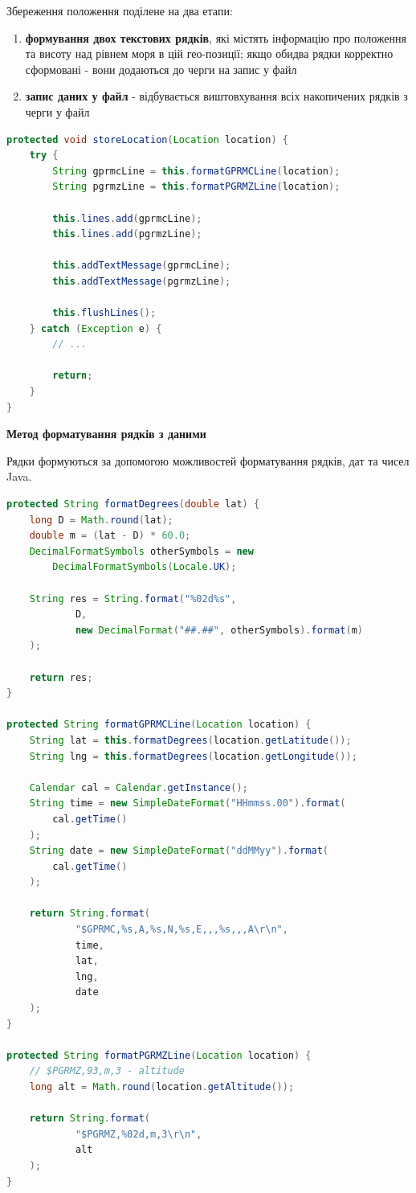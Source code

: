 \documentclass[simple,a4paper,14pt,ukrainian,utf8]{eskdtext}
\begin{document}
			Збереження положення поділене на два етапи:
			
			\begin{enumerate}
				\item \textbf{формування двох текстових рядків}, які містять інформацію про положення та висоту над рівнем моря в цій гео-позиції; якщо обидва рядки корректно сформовані - вони додаються до черги на запис у файл
				\item \textbf{запис даних у файл} - відбувається виштовхування всіх накопичених рядків з черги у файл
			\end{enumerate}
			
\begin{lstlisting}[language=Java]
protected void storeLocation(Location location) {
    try {
        String gprmcLine = this.formatGPRMCLine(location);
        String pgrmzLine = this.formatPGRMZLine(location);

        this.lines.add(gprmcLine);
        this.lines.add(pgrmzLine);

        this.addTextMessage(gprmcLine);
        this.addTextMessage(pgrmzLine);

        this.flushLines();
    } catch (Exception e) {
        // ...

        return;
    }
}
\end{lstlisting}
        	
        	\textbf{Метод форматування рядків з даними}
        	
        	Рядки формуються за допомогою можливостей форматування рядків, дат та чисел Java.
        	
\begin{lstlisting}[language=Java]
protected String formatDegrees(double lat) {
    long D = Math.round(lat);
    double m = (lat - D) * 60.0;
    DecimalFormatSymbols otherSymbols = new 
    	DecimalFormatSymbols(Locale.UK);

    String res = String.format("%02d%s",
            D,
            new DecimalFormat("##.##", otherSymbols).format(m)
    );

    return res;
}

protected String formatGPRMCLine(Location location) {
    String lat = this.formatDegrees(location.getLatitude());
    String lng = this.formatDegrees(location.getLongitude());

    Calendar cal = Calendar.getInstance();
    String time = new SimpleDateFormat("HHmmss.00").format(
    	cal.getTime()
    );
    String date = new SimpleDateFormat("ddMMyy").format(
    	cal.getTime()
    );

    return String.format(
            "$GPRMC,%s,A,%s,N,%s,E,,,%s,,,A\r\n",
            time,
            lat,
            lng,
            date
    );
}

protected String formatPGRMZLine(Location location) {
    // $PGRMZ,93,m,3 - altitude
    long alt = Math.round(location.getAltitude());

    return String.format(
            "$PGRMZ,%02d,m,3\r\n",
            alt
    );
}
\end{lstlisting}
        	
\end{document}
